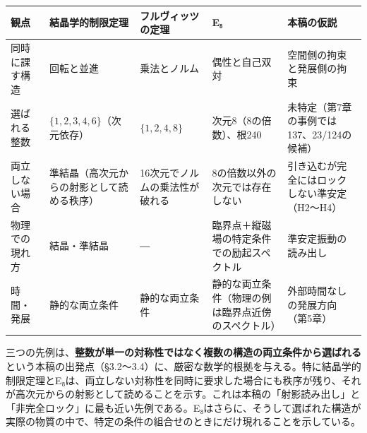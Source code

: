 \documentclass[
  a4paper,
]{ltjsarticle}
\newcounter{none} %
\begin{document}
{\def\LTcaptype{none} %
\begin{longtable}[]{@{}
  >{\raggedright\arraybackslash}p{}
  >{\raggedright\arraybackslash}p{}
  >{\raggedright\arraybackslash}p{}
  >{\raggedright\arraybackslash}p{}
  >{\raggedright\arraybackslash}p{}@{}}
\toprule\noalign{}
\begin{minipage}[b]{\linewidth}\raggedright
観点
\end{minipage} & \begin{minipage}[b]{\linewidth}\raggedright
結晶学的制限定理
\end{minipage} & \begin{minipage}[b]{\linewidth}\raggedright
フルヴィッツの定理
\end{minipage} & \begin{minipage}[b]{\linewidth}\raggedright
E₈
\end{minipage} & \begin{minipage}[b]{\linewidth}\raggedright
本稿の仮説
\end{minipage} \\
\midrule\noalign{}
\endhead
\bottomrule\noalign{}
\endlastfoot
同時に課す構造 & 回転と並進 & 乗法とノルム & 偶性と自己双対 &
空間側の拘束と発展側の拘束 \\
選ばれる整数 & \(\{1,2,3,4,6\}\)（次元依存） & \(\{1,2,4,8\}\) &
次元8（8の倍数）、根240 & 未特定（第7章の事例では137、23/124の候補） \\
両立しない場合 & 準結晶（高次元からの射影として読める秩序） &
16次元でノルムの乗法性が破れる & 8の倍数以外の次元では存在しない &
引き込むが完全にはロックしない準安定（H2〜H4） \\
物理での現れ方 & 結晶・準結晶 & ― &
臨界点＋縦磁場の特定条件での励起スペクトル & 準安定振動の読み出し \\
時間・発展 & 静的な両立条件 & 静的な両立条件 &
静的な両立条件（物理の例は臨界点近傍のスペクトル） &
外部時間なしの発展方向（第5章） \\
\end{longtable}
}

三つの先例は、\textbf{整数が単一の対称性ではなく複数の構造の両立条件から選ばれる}という本稿の出発点（§3.2〜3.4）に、厳密な数学的根拠を与える。特に結晶学的制限定理とE₈は、両立しない対称性を同時に要求した場合にも秩序が残り、それが高次元からの射影として読めることを示す。これは本稿の「射影読み出し」と「非完全ロック」に最も近い先例である。E₈はさらに、そうして選ばれた構造が実際の物質の中で、特定の条件の組合せのときにだけ現れることを示している。
\end{document}
